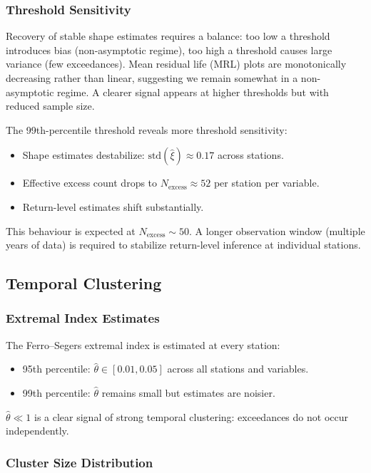 \subsubsection{Threshold Sensitivity}

Recovery of stable shape estimates requires a balance: too low a threshold introduces bias (non-asymptotic regime), too high a threshold causes large variance (few exceedances). Mean residual life (MRL) plots are monotonically decreasing rather than linear, suggesting we remain somewhat in a non-asymptotic regime. A clearer signal appears at higher thresholds but with reduced sample size.

The 99th-percentile threshold reveals more threshold sensitivity:
\begin{itemize}
    \item Shape estimates destabilize: $\text{std}(\hat{\xi}) \approx 0.17$ across stations.
    \item Effective excess count drops to $N_{\text{excess}} \approx 52$ per station per variable.
    \item Return-level estimates shift substantially.
\end{itemize}

This behaviour is expected at $N_{\text{excess}} \sim 50$. A longer observation window (multiple years of data) is required to stabilize return-level inference at individual stations.

\subsection{Temporal Clustering}

\subsubsection{Extremal Index Estimates}

The Ferro--Segers extremal index is estimated at every station:
\begin{itemize}
    \item 95th percentile: $\hat{\theta} \in [0.01, 0.05]$ across all stations and variables.
    \item 99th percentile: $\hat{\theta}$ remains small but estimates are noisier.
\end{itemize}

$\hat{\theta} \ll 1$ is a clear signal of strong temporal clustering: exceedances do not occur independently.

\subsubsection{Cluster Size Distribution}

